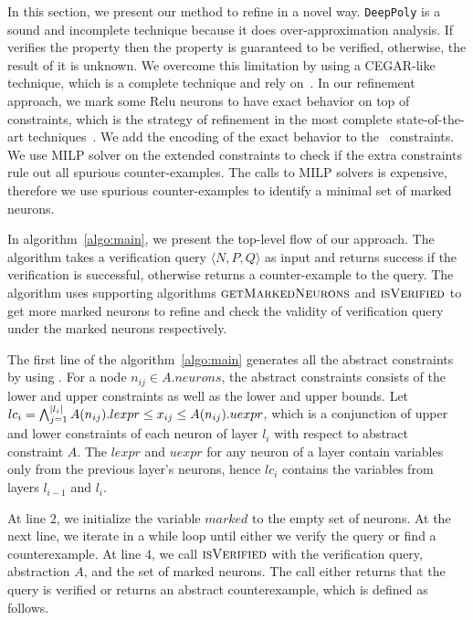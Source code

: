 In this section, we present our method to refine \deeppoly in a novel way.
%
\texttt{DeepPoly} is a sound and incomplete technique because it does over-approximation analysis. 
If \deeppoly{} verifies the property then the property is guaranteed to be verified, otherwise, the
result of it is unknown. 
We overcome this limitation by using a CEGAR-like technique, which is a complete technique
and rely on~\deeppoly{}. 
In our refinement approach, we mark some Relu neurons to have exact behavior on top
of~\deeppoly{} constraints, which is the strategy of refinement in the most complete
state-of-the-art techniques~\cite{alphabeta,etc}.
We add the encoding of the exact behavior to the~\deeppoly{} constraints.
%
We use MILP solver on the extended constraints to
check if the extra constraints rule out all spurious counter-examples.
%
The calls to MILP solvers is expensive,
therefore
we use spurious counter-examples to identify a minimal set of marked neurons.


In algorithm~\ref{algo:main}, we present the top-level flow of our approach.
The algorithm takes a verification query $\langle N,P,Q \rangle$ as input and returns
success if the verification is successful, otherwise
returns a counter-example to the query.
The algorithm uses supporting algorithms $\textsc{getMarkedNeurons}$ and
$\textsc{isVerified}$ to
get more marked neurons to refine and check the validity of verification query under
the marked neurons respectively.

The first line of the algorithm~\ref{algo:main} generates all the abstract constraints
by using \deeppoly{}.
For a node $n_{ij} \in A.neurons$,
the abstract constraints consists of the lower and upper constraints as well as the lower and upper bounds.
Let $lc_i = \bigwedge_{j=1}^{|l_i|} A(n_{ij}).lexpr \leq x_{ij} \leq  A(n_{ij}).uexpr$, which is a 
conjunction of upper and lower constraints of each neuron of layer $l_i$ with respect to abstract constraint $A$.
The $lexpr$ and $uexpr$ for any neuron of a layer contain variables only from the previous layer's neurons, 
hence $lc_i$ contains the variables from layers $l_{i-1}$ and $l_i$. 


%
At line 2, we initialize the variable $marked$ to the empty set of neurons.
%
At the next line, we iterate in a while loop until either we verify the query or
find a counterexample.
%
At line 4, we call $\textsc{isVerified}$ with the verification query, abstraction $A$, and the
set of marked neurons.
The call either returns that the query is verified or returns an abstract counterexample,
which is defined as follows.



